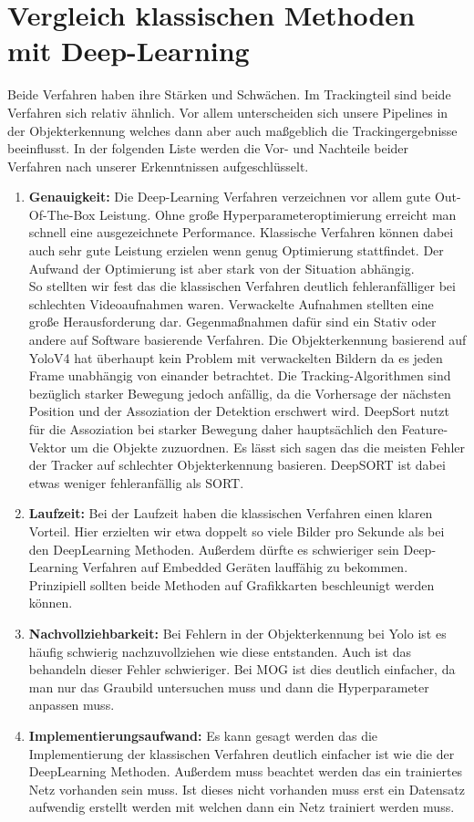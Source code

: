 \documentclass[conference]{IEEEtran}
\begin{document}
	\section{Vergleich klassischen Methoden mit Deep-Learning}
	Beide Verfahren haben ihre Stärken und Schwächen. Im Trackingteil sind beide Verfahren sich relativ ähnlich. Vor allem unterscheiden sich unsere Pipelines in der Objekterkennung welches dann aber auch maßgeblich die Trackingergebnisse beeinflusst. In der folgenden Liste werden die Vor- und Nachteile beider Verfahren nach unserer Erkenntnissen aufgeschlüsselt.
	\begin{enumerate}
		\item \textbf{Genauigkeit:} Die Deep-Learning Verfahren verzeichnen vor allem gute Out-Of-The-Box Leistung. Ohne große Hyperparameteroptimierung erreicht man schnell eine ausgezeichnete Performance. Klassische Verfahren können dabei auch sehr gute Leistung erzielen wenn genug Optimierung stattfindet. Der Aufwand der Optimierung ist aber stark von der Situation abhängig.\\
		So stellten wir fest das die klassischen Verfahren deutlich fehleranfälliger bei schlechten Videoaufnahmen waren. Verwackelte Aufnahmen stellten eine große Herausforderung dar. Gegenmaßnahmen dafür sind ein Stativ oder andere auf Software basierende Verfahren. Die Objekterkennung basierend auf YoloV4 hat überhaupt kein Problem mit verwackelten Bildern da es jeden Frame unabhängig von einander betrachtet. Die Tracking-Algorithmen sind bezüglich starker Bewegung jedoch anfällig, da die Vorhersage der nächsten Position und der Assoziation der Detektion erschwert wird. DeepSort nutzt für die Assoziation bei starker Bewegung daher hauptsächlich den Feature-Vektor um die Objekte zuzuordnen. Es lässt sich sagen das die meisten Fehler der Tracker auf schlechter Objekterkennung basieren. DeepSORT ist dabei etwas weniger fehleranfällig als SORT.
		
		\item \textbf{Laufzeit:} Bei der Laufzeit haben die klassischen Verfahren einen klaren Vorteil. Hier erzielten wir etwa doppelt so viele Bilder pro Sekunde als bei den DeepLearning Methoden. Außerdem dürfte es schwieriger sein Deep-Learning Verfahren auf Embedded Geräten lauffähig zu bekommen. Prinzipiell sollten beide Methoden auf Grafikkarten beschleunigt werden können.
		
		\item \textbf{Nachvollziehbarkeit:} Bei Fehlern in der Objekterkennung bei Yolo ist es häufig schwierig nachzuvollziehen wie diese entstanden. Auch ist das behandeln dieser Fehler schwieriger. Bei MOG ist dies deutlich einfacher, da man nur das Graubild untersuchen muss und dann die Hyperparameter anpassen muss.
		
		\item \textbf{Implementierungsaufwand:} Es kann gesagt werden das die Implementierung der klassischen Verfahren deutlich einfacher ist wie die der DeepLearning Methoden. Außerdem muss beachtet werden das ein trainiertes Netz vorhanden sein muss. Ist dieses nicht vorhanden muss erst ein Datensatz aufwendig erstellt werden mit welchen dann ein Netz trainiert werden muss.
		
	\end{enumerate}
\end{document}
